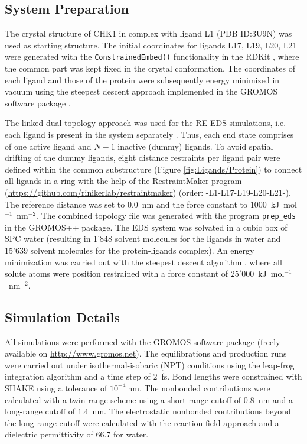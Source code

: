 \subsection{System Preparation}%
The crystal structure of CHK1 in complex with ligand L1 (PDB ID:3U9N) was used as starting structure. The initial coordinates for ligands L17, L19, L20, L21 were generated with the {\tt{ConstrainedEmbed()}} functionality in the RDKit \cite{Landrum2021}, where the common part was kept fixed in the crystal conformation. The coordinates of each ligand and those of the protein were subsequently energy minimized in vacuum using the steepest descent \cite{Ruder2016} approach implemented in the GROMOS software package \cite{Schmid2012}. 

The linked dual topology approach was used for the RE-EDS simulations, i.e. each ligand is present in the system separately \cite{Riniker2011}. Thus, each end state comprises of one active ligand and $N-1$ inactive (dummy) ligands. To avoid spatial drifting of the dummy ligands, eight distance restraints per ligand pair were defined within the common substructure (Figure \ref{fig:Ligands/Protein}) to connect all ligands in a ring with the help of the RestraintMaker program (\url{https://github.com/rinikerlab/restraintmaker}) (order: -L1-L17-L19-L20-L21-). The reference distance was set to 0.0~nm and the force constant to $1000$~kJ~mol$^{-1}$~nm$^{-2}$.
The combined topology file was generated with the program {\tt{prep\_eds}} in the GROMOS++ \cite{Eichenberger2011} package. 
The EDS system was solvated in a cubic box of SPC \cite{Berendsen1981} water (resulting in 1'848 solvent molecules for the ligands in water and 15'639 solvent molecules for the protein-ligands complex). 
An energy minimization was carried out with the steepest descent algorithm \cite{Ruder2016}, where all solute atoms were position restrained with a force constant of $25'000$~kJ~mol$^{-1}$~nm$^{-2}$. 

\subsection{Simulation Details}
All simulations were performed with the GROMOS software package \cite{Schmid2012} (freely available on \url{http://www.gromos.net}).
The equilibrations and production runs were carried out under isothermal-isobaric (NPT) conditions using the leap-frog integration algorithm \cite{Hockney1970} and a time step of $2$~fs. 
Bond lengths were constrained with SHAKE \cite{Ryckaert1977} using a tolerance of $10^{-4}~$nm. 
The nonbonded contributions were calculated with a twin-range scheme using a short-range cutoff of $0.8$~nm and a long-range cutoff of $1.4$~nm. 
The electrostatic nonbonded contributions beyond the long-range cutoff were calculated with the reaction-field \cite{Tironi1995} approach and a dielectric permittivity of 66.7 \cite{Glattli2002} for water. 

